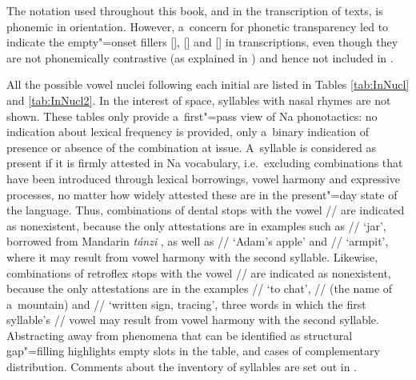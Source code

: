\newpage 	
The notation used throughout this book, and in the transcription of texts, is phonemic in
orientation. However, a~concern for phonetic transparency led to indicate the empty"=onset fillers [{\kern1.3pt}], [] and [] in transcriptions, even though they are not phonemically contrastive (as explained in ) and hence not included in . 

All the possible vowel nuclei following each initial are listed in Tables \ref{tab:InNucl} and \ref{tab:InNucl2}. In the interest of space, syllables with nasal rhymes are not shown. These tables only provide a~first"=pass view of Na phonotactics: no indication about lexical frequency is provided, only a~binary indication of presence or absence of the combination at issue. A~syllable is considered as present if it is firmly attested in Na vocabulary, i.e.\ excluding combinations that have been introduced through lexical borrowings, vowel harmony and expressive processes, no matter how widely attested these are in the present"=day state of the language. Thus, combinations of dental stops with the vowel // are indicated as nonexistent, because the only attestations are in examples such as // ‘jar’, borrowed from {Mandarin} \textit{tánzi} , as well as // ‘Adam's apple’ and // ‘armpit’, where it may result from vowel harmony with the second syllable. Likewise, combinations of retroflex stops with the vowel // are indicated as nonexistent, because the only attestations are in the examples // ‘to chat’, // (the name of a~mountain) and // ‘written sign, tracing’, three words in which the first syllable's // vowel  may result from vowel harmony with the second syllable. Abstracting away from phenomena that can be identified as {structural} gap"=filling highlights empty slots in the table, and cases of complementary distribution. Comments about the inventory of syllables are set out in .
